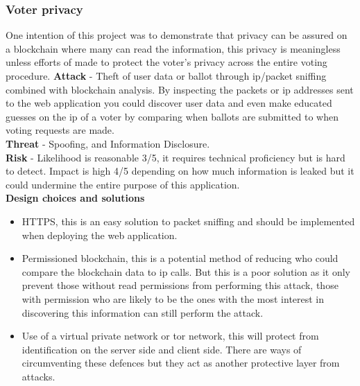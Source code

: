 \documentclass{entcs}
\begin{document}
\subsubsection{Voter privacy}
One intention of this project was to demonstrate that privacy can be assured on a blockchain where many can read the information, this privacy is meaningless unless efforts of made to protect the voter's privacy across the entire voting procedure. 
\textbf{Attack} - Theft of user data or ballot through ip/packet sniffing \cite{ansari2002packet} combined with blockchain analysis. By inspecting the packets or ip addresses sent to the web application you could discover user data and even make educated guesses on the ip of a voter by comparing when ballots are submitted to when voting requests are made. \\
\textbf{Threat} - Spoofing, and Information Disclosure. \\
\textbf{Risk} - Likelihood is reasonable 3/5, it requires technical proficiency but is hard to detect. Impact is high 4/5 depending on how much information is leaked but it could undermine the entire purpose of this application.\\
\textbf{Design choices and solutions}
\begin{itemize}
    \item HTTPS, this is an easy solution to packet sniffing and should be implemented when deploying the web application.
    \item Permissioned blockchain, this is a potential method of reducing who could compare the blockchain data to ip calls. But this is a poor solution as it only prevent those without read permissions from performing this attack, those with permission who are likely to be the ones with the most interest in discovering this information can still perform the attack.
    \item Use of a virtual private network or tor network, this will protect from identification on the server side and client side. There are ways of circumventing these defences but they act as another protective layer from attacks.
\end{itemize}
\end{document}
